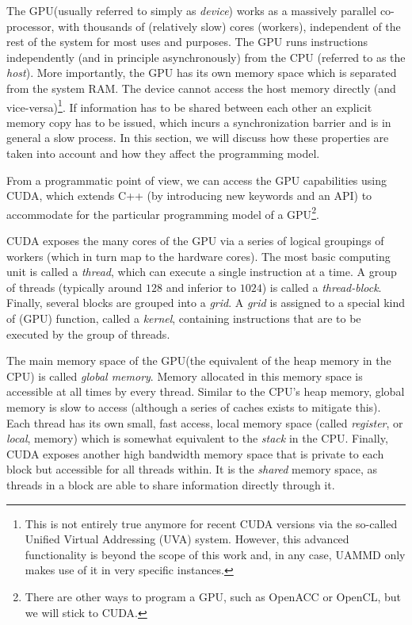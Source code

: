 \documentclass[twoside,openright,titlepage,numbers=noenddot,%
headinclude,footinclude,cleardoublepage=empty,abstract=on,
BCOR=5mm,fontsize=11pt, dvipsnames, paper=b5
]{scrreprt}
\newcommand{\uammd}{\gls{UAMMD}\xspace}
\newcommand{\gpu}{\gls{GPU}\xspace}
\begin{document}
The \gpu (usually referred to simply as \emph{device}) works as a massively parallel co-processor, with thousands of (relatively slow) cores (workers), independent of the rest of the system for most uses and purposes. The \gpu runs instructions independently (and in principle asynchronously) from the CPU (referred to as the \emph{host}). More importantly, the \gpu has its own memory space which is separated from the system RAM. The device cannot access the host memory directly (and vice-versa)\footnote{This is not entirely true anymore for recent CUDA versions via the so-called Unified Virtual Addressing (UVA) system. However, this advanced functionality is beyond the scope of this work and, in any case, \uammd only makes use of it in very specific instances.}. If information has to be shared between each other an explicit memory copy has to be issued, which incurs a synchronization barrier and is in general a slow process. In this section, we will discuss how these properties are taken into account and how they affect the programming model.

From a programmatic point of view, we can access the \gpu capabilities using CUDA, which extends C++ (by introducing new keywords and an \gls{API}) to accommodate for the particular programming model of a \gpu\footnote{There are other ways to program a \gpu, such as OpenACC\cite{openacc} or OpenCL\cite{Stone2010}, but we will stick to CUDA.}.

CUDA exposes the many cores of the \gpu via a series of logical groupings of workers (which in turn map to the hardware cores). The most basic computing unit is called a \emph{thread}, which can execute a single instruction at a time. A group of threads (typically around $128$ and inferior to $1024$) is called a \emph{thread-block}. Finally, several blocks are grouped into a \emph{grid}. A \emph{grid} is assigned to a special kind of (\gpu) function, called a \emph{kernel}, containing instructions that are to be executed by the group of threads.

The main memory space of the \gpu (the equivalent of the heap memory in the CPU) is called \emph{global memory}. Memory allocated in this memory space is accessible at all times by every thread. 
Similar to the CPU's heap memory, global memory is slow to access (although a series of caches exists to mitigate this).
Each thread has its own small, fast access, local memory space (called \emph{register}, or \emph{local}, memory) which is somewhat equivalent to the \emph{stack} in the CPU.
Finally, CUDA exposes another high bandwidth memory space that is private to each block but accessible for all threads within. It is the \emph{shared} memory space, as threads in a block are able to share information directly through it.
\end{document}
